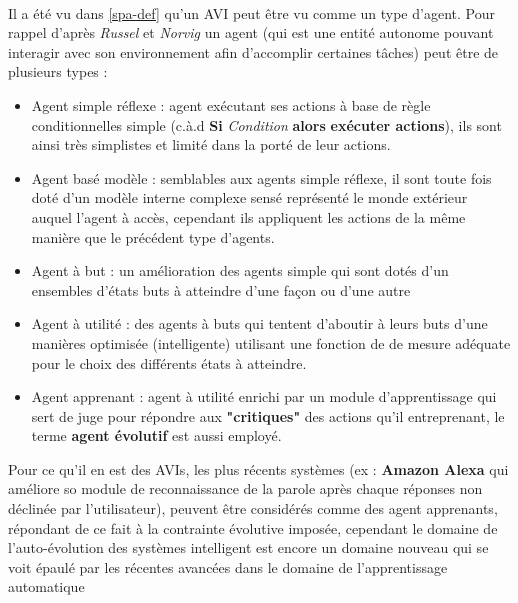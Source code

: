 \paragraph{}
Il a été vu dans \ref{spa-def} qu'un AVI peut être vu comme un type d'agent. Pour rappel d'après \textit{Russel} et \textit{Norvig} un agent (qui est une entité autonome pouvant interagir avec son environnement afin d'accomplir certaines tâches) peut être de plusieurs types : 
\begin{itemize}
	\item Agent simple réflexe : agent exécutant ses actions à base de règle conditionnelles simple (c.à.d \textbf{Si} \textit{Condition } \textbf{alors} \textbf{exécuter actions}), ils sont ainsi très simplistes et limité dans la porté de leur actions.
	
	\item Agent basé modèle : semblables aux agents simple réflexe, il sont toute fois doté d'un modèle interne complexe sensé représenté le monde extérieur auquel l'agent à accès, cependant ils appliquent les actions de la même manière que le précédent type d'agents.
	
	\item Agent à but : un amélioration des agents simple qui sont dotés d'un ensembles d'états buts à atteindre d'une façon ou d'une autre
	
	\item Agent à utilité : des agents à buts qui tentent d'aboutir à leurs buts d'une manières optimisée (intelligente) utilisant une fonction de de mesure adéquate pour le choix des différents états à atteindre.
	
	\item Agent apprenant : agent à utilité enrichi par un module d'apprentissage qui sert de juge pour répondre aux \textbf{"critiques"} des actions qu'il entreprenant, le terme \textbf{agent évolutif} est aussi employé.
\end{itemize}
\par Pour ce qu'il en est des AVIs, les plus récents systèmes (ex : \textbf{Amazon Alexa} qui améliore so  module de reconnaissance de la parole après chaque réponses non déclinée par l'utilisateur), peuvent être considérés comme des agent apprenants, répondant de ce fait à la contrainte évolutive imposée, cependant le domaine de l'auto-évolution des systèmes intelligent est encore un domaine nouveau qui se voit épaulé par les récentes avancées dans le domaine de l'apprentissage automatique \cite{SPA-overview}


